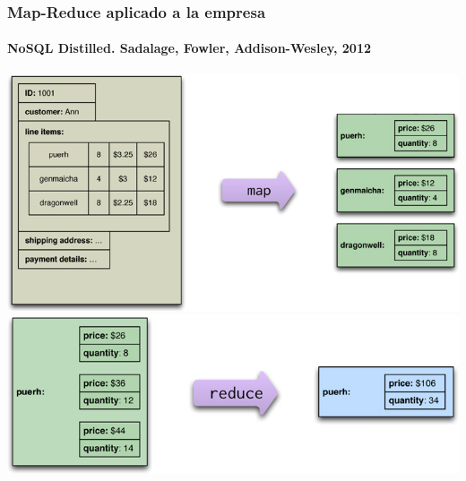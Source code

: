 \documentclass[14pt]{beamer}
\begin{document}





\begin{frame}[allowframebreaks]
  \frametitle{Map-Reduce aplicado a la empresa}
  \framesubtitle{NoSQL Distilled. Sadalage, Fowler, Addison-Wesley, 2012}
  \includegraphics[width=\textwidth]{img/mapreduce1}
  \framebreak
  \includegraphics[width=\textwidth]{img/mapreduce2}
\end{frame}
\end{document}
